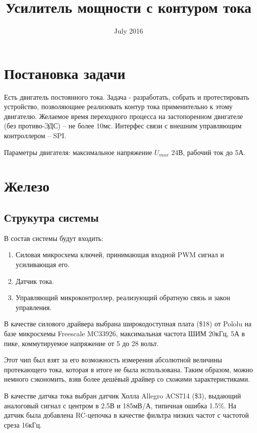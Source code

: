 \documentclass{scrartcl}
\title{Усилитель мощности с контуром тока}
\author{}
\date{July 2016}
\begin{document}
\maketitle

\section{Постановка задачи}
Есть двигатель постоянного тока. Задача - разработать, собрать и протестировать устройство, позволяющиее реализовать контур тока применительно к этому двигателю. 
Желаемое время переходного процесса на застопоренном двигателе (без противо-ЭДС) -- не более 10мс. Интерфес связи с внешним управляющим контроллером -- SPI.

Параметры двигателя: максимальное напряжение $U_{max}$ 24В, рабочий ток до 5А.

\section{Железо}
\subsection{Струкутра системы}
В состав системы будут входить: 
\begin{enumerate}
    \item Силовая микросхема ключей, принимающая входной PWM сигнал и усиливающая его.
    \item Датчик тока.
    \item Управляющий микроконтроллер, реализующий обратную связь и закон управления.
\end{enumerate}


В качестве силового драйвера выбрана широкодоступная плата (\$18) от Pololu на базе микросхемы Freescale MC33926, максимальная частота ШИМ 20кГц, 5А в пике, коммутируемое напряжение от 5 до 28 вольт. 

Этот чип был взят за его возможность измерения абсолютной величины протекающего тока, которая в итоге не была использована. Таким образом, можно немного сэкономить, взяв более дешёвый драйвер со схожими характеристиками.


В качестве датчка тока выбран датчик Холла Allegro ACS714 (\$3), выдающий аналоговый сигнал с центром в 2.5В и 185мВ/А, типичная ошибка 1.5\%. На датчик была добавлена RC-цепочка в качестве фильтра низких частот с частотой среза 16кГц.
\end{document}
